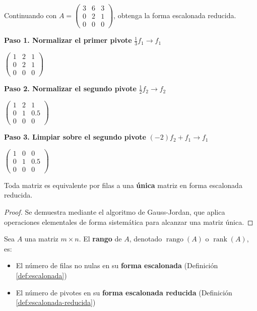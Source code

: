 \begin{example}
Continuando con $A = \begin{pmatrix} 3 & 6 & 3 \\ 0 & 2 & 1 \\ 0 & 0 & 0 \end{pmatrix}$, obtenga la forma escalonada reducida.
\begin{myproof}
\textbf{Paso 1. Normalizar el primer pivote} $\tfrac{1}{3}f_1 \to f_1$

$\begin{pmatrix} 1 & 2 & 1 \\ 0 & 2 & 1 \\ 0 & 0 & 0 \end{pmatrix}$

\textbf{Paso 2. Normalizar el segundo pivote} $\tfrac{1}{2}f_2 \to f_2$

$\begin{pmatrix} 1 & 2 & 1 \\ 0 & 1 & 0.5 \\ 0 & 0 & 0 \end{pmatrix}$

\textbf{Paso 3. Limpiar sobre el segundo pivote} $(-2)f_2 + f_1 \to f_1$

$\boxed{\begin{pmatrix} \boxed{1} & 0 & 0 \\ 0 & \boxed{1} & 0.5 \\ 0 & 0 & 0 \end{pmatrix}}$
\end{myproof}
\end{example}

\begin{theorem}
Toda matriz es equivalente por filas a una \textbf{única} matriz en forma escalonada reducida.

\begin{proof}
Se demuestra mediante el algoritmo de Gauss-Jordan, que aplica operaciones elementales de forma sistemática para alcanzar una matriz única.
\end{proof}
\end{theorem}
\begin{definition}\label{def:rango}
Sea \( A \) una matriz \( m \times n \). El \textbf{rango} de \( A \), denotado \( \operatorname{rango}(A) \) o \( \operatorname{rank}(A) \), es:
\begin{itemize}
\item El número de filas no nulas en su \textbf{forma escalonada} (Definición \ref{def:escalonada})
\item El número de pivotes en su \textbf{forma escalonada reducida} (Definición \ref{def:escalonada-reducida})
\end{itemize}
\end{definition}

